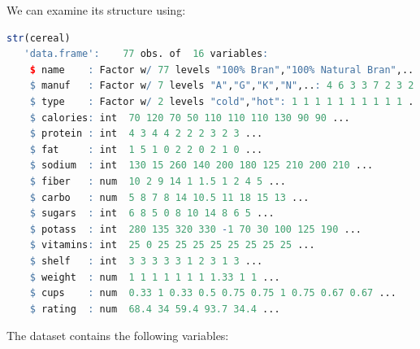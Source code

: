 \documentclass[
  11pt,
]{book}
\theoremstyle{definition}
\theoremstyle{definition}
\theoremstyle{definition}
\theoremstyle{definition}
\theoremstyle{remark}
\begin{document}
We can examine its structure using:

\begin{lstlisting}[language=R]
str(cereal)
   'data.frame':    77 obs. of  16 variables:
    $ name    : Factor w/ 77 levels "100% Bran","100% Natural Bran",..: 1 2 3 4 5 6 7 8 9 10 ...
    $ manuf   : Factor w/ 7 levels "A","G","K","N",..: 4 6 3 3 7 2 3 2 7 5 ...
    $ type    : Factor w/ 2 levels "cold","hot": 1 1 1 1 1 1 1 1 1 1 ...
    $ calories: int  70 120 70 50 110 110 110 130 90 90 ...
    $ protein : int  4 3 4 4 2 2 2 3 2 3 ...
    $ fat     : int  1 5 1 0 2 2 0 2 1 0 ...
    $ sodium  : int  130 15 260 140 200 180 125 210 200 210 ...
    $ fiber   : num  10 2 9 14 1 1.5 1 2 4 5 ...
    $ carbo   : num  5 8 7 8 14 10.5 11 18 15 13 ...
    $ sugars  : int  6 8 5 0 8 10 14 8 6 5 ...
    $ potass  : int  280 135 320 330 -1 70 30 100 125 190 ...
    $ vitamins: int  25 0 25 25 25 25 25 25 25 25 ...
    $ shelf   : int  3 3 3 3 3 1 2 3 1 3 ...
    $ weight  : num  1 1 1 1 1 1 1 1.33 1 1 ...
    $ cups    : num  0.33 1 0.33 0.5 0.75 0.75 1 0.75 0.67 0.67 ...
    $ rating  : num  68.4 34 59.4 93.7 34.4 ...
\end{lstlisting}

The dataset contains the following variables:
\end{document}
